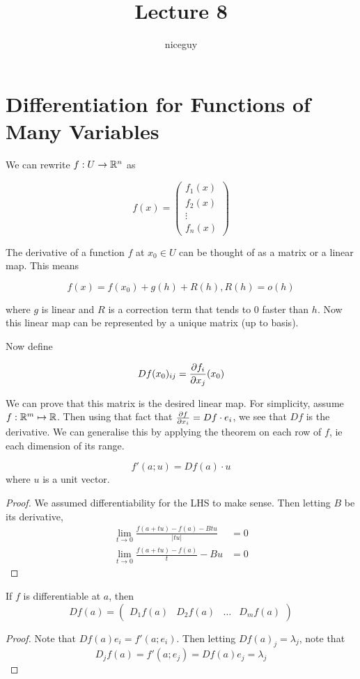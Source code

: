 \documentclass[12pt]{article}
\title{Lecture 8}
\author{niceguy}
\begin{document}
\maketitle

\section{Differentiation for Functions of Many Variables}

We can rewrite $f:U \rightarrow \mathbb{R}^n$ as

$$f(x) = \begin{pmatrix} f_1(x) \\ f_2(x) \\ \vdots \\ f_n(x) \end{pmatrix}$$

The derivative of a function $f$ at $x_0 \in U$ can be thought of as a matrix or a linear map. This means

$$f(x) = f(x_0) + g(h) + R(h), R(h) = o(h)$$

where $g$ is linear and $R$ is a correction term that tends to 0 faster than $h$. Now this linear map can be represented by a unique matrix (up to basis).

Now define

$$Df(x_0)_{ij} = \frac{\partial f_i}{\partial x_j}(x_0)$$

We can prove that this matrix is the desired linear map. For simplicity, assume $f:\mathbb{R}^m\mapsto\mathbb{R}$. Then using that fact that $\frac{\partial f}{\partial x_i} = Df\cdot e_i$, we see that $Df$ is the derivative. We can generalise this by applying the theorem on each row of $f$, ie each dimension of its range.

\begin{lem}
    $$f'(a;u) = Df(a)\cdot u$$
    where $u$ is a unit vector.
\end{lem}

\begin{proof}
    We assumed differentiability for the LHS to make sense. Then letting $B$ be its derivative,
    \begin{align*}
        \lim_{t\rightarrow0} \frac{f(a+tu) - f(a) - Btu}{|tu|} &= 0 \\
        \lim_{t\rightarrow0} \frac{f(a+tu)-f(a)}{t} - Bu &= 0
    \end{align*}
\end{proof}

\begin{lem}
    If $f$ is differentiable at $a$, then
    $$Df(a) = \begin{pmatrix} D_1f(a) & D_2f(a) & \dots & D_mf(a) \end{pmatrix}$$
\end{lem}

\begin{proof}
    Note that $Df(a)e_i = f'(a;e_i)$. Then letting $Df(a)_j = \lambda_j$, note that
    $$D_jf(a) = f'(a;e_j) = Df(a)e_j = \lambda_j$$
\end{proof}
\end{document}
